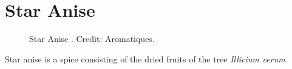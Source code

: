 \section{Star Anise}
\label{sec:star_anise}



\begin{figure}[!ht]
	\vspace{-4ex}
	\centering
	\hfill
	\hfill
	\caption{Star Anise . Credit: Aromatiques.}
	\label{fig:star_anise_imgs}
\end{figure}

Star anise is a spice consisting of the dried fruits of the tree \textit{Illicium verum}. 


